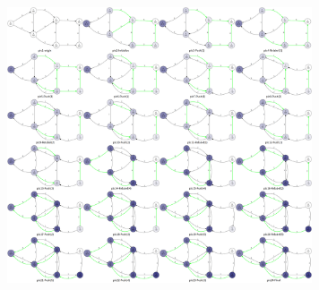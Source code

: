 \documentclass[UTF8, a4paper, titlepage, twoside]{ctexart}
\begin{document}
\begin{center}
	\includegraphics[width=9cm]{graphs/hhlp.png}
\end{center}
\end{document}
